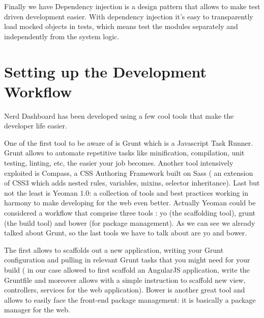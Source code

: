 \documentclass[a4paper,13pt]{report}
\begin{document}
Finally we have Dependency injection is a design pattern that allows to make test driven development easier. With dependency injection it's easy to transparently load mocked objects in tests, which means test the modules separately and independently from the system logic.

 \section{Setting up the Development Workflow}
 Nerd Dashboard has been developed using a few cool tools that make the developer life easier. 

One of the first tool to be aware of is Grunt which is a Javascript Task Runner. Grunt allows to automate repetitive tasks like minification, compilation, unit testing, linting, etc, the easier your job becomes.\newline
Another tool intensively exploited is Compass, a CSS Authoring Framework built on Sass ( an extension of CSS3 which adds nested rules, variables, mixins, selector inheritance).
Last but not the least is Yeoman 1.0: a collection of tools and best practices working in harmony to make developing for the web even better. Actually Yeoman could be considered a workflow that comprise three tools : yo (the scaffolding tool), grunt (the build tool) and bower (for package management). As we can see we already talked about Grunt, so the last tools we have to talk about are yo and bower.

The first allows to scaffolds out a new application, writing your Grunt configuration and pulling in relevant Grunt tasks that you might need for your build ( in our case allowed to first scaffold an AngularJS application, write the Gruntfile and moreover allows with a simple instruction to scaffold new view, controllers, services for the web application). Bower is another great tool and allows to easily face the front-end package management: it is basically a package manager for the web.
\end{document}
